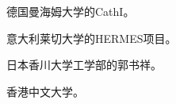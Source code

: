 德国曼海姆大学的CathI\cite{rebholz2004cathi}\cite{hofer2002cathi}。

意大利莱切大学的HERMES项目\cite{aloisio2006HERMES}\cite{aloisio2004HERMES}\cite{aloisio2006aHERMES}\cite{aloisio2005HERMES}。

日本香川大学工学部的郭书祥\cite{Gao2012GUO}\cite{Gao2012aGUO}\cite{Gao2012bGUO}。

香港中文大学\cite{cuhkweb}\cite{guo2007CUHK}\cite{Chui2010CUHK}。




%
%
%
%
%
